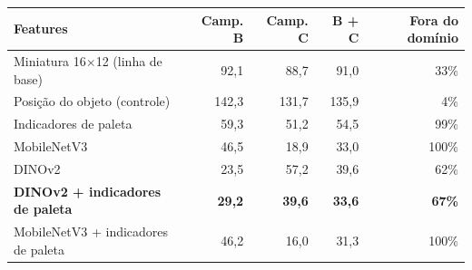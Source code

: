 \begin{tabular}{lrrrr}
\toprule
Features & Camp. B & Camp. C & B + C & Fora do domínio \\
\midrule
Miniatura 16$\times$12 (linha de base) & 92,1 & 88,7 & 91,0 & 33\% \\
Posição do objeto (controle) & 142,3 & 131,7 & 135,9 & 4\% \\
Indicadores de paleta & 59,3 & 51,2 & 54,5 & 99\% \\
MobileNetV3 & 46,5 & 18,9 & 33,0 & 100\% \\
DINOv2 & 23,5 & 57,2 & 39,6 & 62\% \\
\textbf{DINOv2 + indicadores de paleta} & \textbf{29,2} & \textbf{39,6} & \textbf{33,6} & \textbf{67\%} \\
MobileNetV3 + indicadores de paleta & 46,2 & 16,0 & 31,3 & 100\% \\
\bottomrule
\end{tabular}
